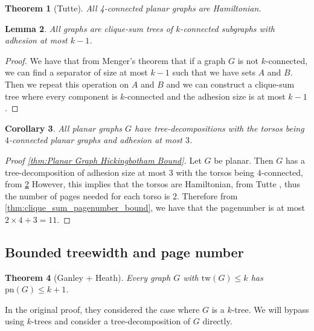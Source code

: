 \documentclass[]{report}
\newcommand{\tw}{\text{tw}}
\newcommand{\pn}{\text{pn}}
\newtheorem{theorem}{Theorem}
\newtheorem{corollary}[theorem]{Corollary}
\newtheorem{lemma}[theorem]{Lemma}
\theoremstyle{definition}
\numberwithin{theorem}{section}
\numberwithin{equation}{section}
\begin{document}
\begin{theorem}[Tutte\cite{tutteTheoremPlanarGraphs1956}]\label{thm:4-connected_planar_ham_cycle}
	All 4-connected planar graphs are Hamiltonian.
\end{theorem}

\begin{lemma}\label{lem:clique_sum_connected}
	All graphs are clique-sum trees of $k$-connected subgraphs with adhesion at most $k-1$.
\end{lemma}
\begin{proof}
	We have that from Menger's theorem that if a graph $G$ is not $k$-connected, we can find a separator of size at most $k-1$ such that we have sets $A$ and $B$. Then we repeat this operation on $A$ and $B$ and we can construct a clique-sum tree where every component is $k$-connected and the adhesion size is at most $k-1$. 
\end{proof}

\begin{corollary}\label{corr:planar_graphs_4_connected_cliqesums}
	All planar graphs $G$ have tree-decompositions with the torsos being $4$-connected planar graphs and adhesion at most $3$.
\end{corollary}


\begin{proof}[Proof \cref{thm:Planar Graph Hickingbotham Bound}]
	Let $G$ be planar. Then $G$ has a tree-decomposition of adhesion size at most $3$ with the torsos being $4$-connected, from \cref{lem:clique_sum_connected} However, this implies that the torsos are Hamiltonian, from Tutte \cite{tutteTheoremPlanarGraphs1956}, thus the number of pages needed for each torso is $2$. Therefore from \cref{thm:clique_sum_pagenumber_bound}, we have that the pagenumber is at most $2 \times 4 + 3 = 11$. 
\end{proof}


\subsection{Bounded treewidth and page number}\label{ssec:Bounded_Treewidth}
\begin{theorem}[Ganley + Heath\cite{ganleyPagenumberTrees2001}]\label{thm:bded_treewidth_bded_pagenumber}
	Every graph $G$ with $\tw(G) \leq k$ has $\pn(G) \leq k + 1$. 
\end{theorem}
In the original proof, they considered the case where $G$ is a $k$-tree. We will bypass using $k$-trees and consider a tree-decomposition of $G$ directly. 
\end{document}
